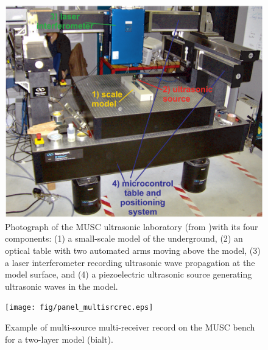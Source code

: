 \documentclass[manuscript,revised]{geophysics}
\begin{document}
\begin{figure}[!h]
	\centering
	\includegraphics[scale=0.4]{fig/panel_musc_bench.eps}
	\caption{Photograph of the MUSC ultrasonic laboratory (from \citet{Bretaudeau_FWI_2013} )with its four components: (1) a small-scale model of the underground, (2) an optical table with two automated arms moving above the model, (3) a laser interferometer recording ultrasonic wave propagation	at the model surface, and (4) a piezoelectric ultrasonic source generating ultrasonic waves in the model.}
	\label{panel_musc_bench}
\end{figure}

\begin{figure}[!h]
	\centering
	\texttt{[image: fig/panel\_multisrcrec.eps]}
	\caption{Example of multi-source multi-receiver record on the MUSC bench for a two-layer model (bialt).}
	\label{panel_multisrcrec}
\end{figure}
\end{document}
